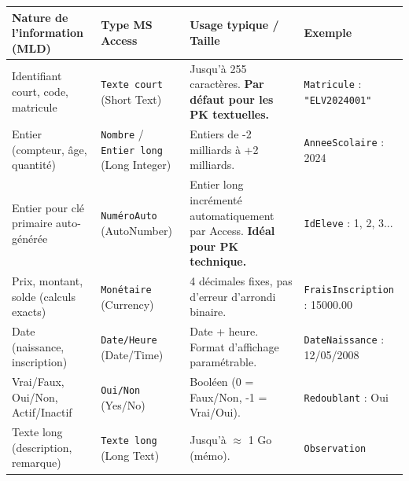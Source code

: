 \documentclass[11pt]{article}
\begin{document}
\begin{exemplebox}
\begin{center}
\begin{tabularx}{\linewidth}{|l|X|X|l|}
\hline
\rowcolor{popblueL}
\textbf{Nature de l'information (MLD)} & \textbf{Type MS Access} & \textbf{Usage typique / Taille} & \textbf{Exemple} \\
\hline
Identifiant court, code, matricule & \texttt{Texte court} (Short Text) & Jusqu'à 255 caractères. \textbf{Par défaut pour les PK textuelles.} & \texttt{Matricule} : \texttt{"ELV2024001"} \\
Entier (compteur, âge, quantité) & \texttt{Nombre} / \texttt{Entier long} (Long Integer) & Entiers de -2 milliards à +2 milliards. & \texttt{AnneeScolaire} : 2024 \\
Entier pour clé primaire auto-générée & \texttt{NuméroAuto} (AutoNumber) & Entier long incrémenté automatiquement par Access. \textbf{Idéal pour PK technique.} & \texttt{IdEleve} : 1, 2, 3... \\
Prix, montant, solde (calculs exacts) & \texttt{Monétaire} (Currency) & 4 décimales fixes, pas d'erreur d'arrondi binaire. & \texttt{FraisInscription} : 15000.00 \\
Date (naissance, inscription) & \texttt{Date/Heure} (Date/Time) & Date + heure. Format d'affichage paramétrable. & \texttt{DateNaissance} : 12/05/2008 \\
Vrai/Faux, Oui/Non, Actif/Inactif & \texttt{Oui/Non} (Yes/No) & Booléen (0 = Faux/Non, -1 = Vrai/Oui). & \texttt{Redoublant} : Oui \\
Texte long (description, remarque) & \texttt{Texte long} (Long Text) & Jusqu'à $\approx$ 1 Go (mémo). & \texttt{Observation} \\
\hline
\end{tabularx}
\end{center}
\end{exemplebox}
\end{document}
